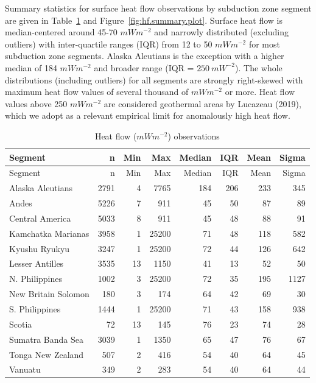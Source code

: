 \documentclass[draft,linenumbers]{agujournal2018}
\begin{document}
Summary statistics for surface heat flow observations by subduction zone
segment are given in Table~\ref{tbl:hf.summary.table} and
Figure~\ref{fig:hf.summary.plot}. Surface heat flow is median-centered
around 45-70 \(mWm^{-2}\) and narrowly distributed (excluding outliers)
with inter-quartile ranges (IQR) from 12 to 50 \(mWm^{-2}\) for most
subduction zone segments. Alaska Aleutians is the exception with a
higher median of 184 \(mWm^{-2}\) and broader range (IQR =
\(250~mW^{-2}\)). The whole distributions (including outliers) for all
segments are strongly right-skewed with maximum heat flow values of
several thousand of \(mWm^{-2}\) or more. Heat flow values above 250
\(mWm^{-2}\) are considered geothermal areas by Lucazeau (2019), which
we adopt as a relevant empirical limit for anomalously high heat flow.

\hypertarget{tbl:hf.summary.table}{}
\begin{longtable}[]{@{}lrrrrrrr@{}}
\caption{\label{tbl:hf.summary.table}Heat flow (\(mWm^{-2}\))
observations}\tabularnewline
\toprule
Segment & n & Min & Max & Median & IQR & Mean & Sigma \\
\midrule
\endfirsthead
\toprule
Segment & n & Min & Max & Median & IQR & Mean & Sigma \\
\midrule
\endhead
Alaska Aleutians & 2791 & 4 & 7765 & 184 & 206 & 233 & 345 \\
Andes & 5226 & 7 & 911 & 45 & 50 & 87 & 89 \\
Central America & 5033 & 8 & 911 & 45 & 48 & 88 & 91 \\
Kamchatka Marianas & 3958 & 1 & 25200 & 71 & 48 & 118 & 582 \\
Kyushu Ryukyu & 3247 & 1 & 25200 & 72 & 44 & 126 & 642 \\
Lesser Antilles & 3535 & 13 & 1150 & 41 & 13 & 52 & 50 \\
N. Philippines & 1002 & 3 & 25200 & 72 & 35 & 195 & 1127 \\
New Britain Solomon & 180 & 3 & 174 & 64 & 42 & 69 & 30 \\
S. Philippines & 1444 & 1 & 25200 & 71 & 43 & 158 & 938 \\
Scotia & 72 & 13 & 145 & 76 & 23 & 74 & 28 \\
Sumatra Banda Sea & 3039 & 1 & 1350 & 65 & 47 & 76 & 67 \\
Tonga New Zealand & 507 & 2 & 416 & 54 & 40 & 64 & 45 \\
Vanuatu & 349 & 2 & 283 & 54 & 40 & 64 & 44 \\
\bottomrule
\end{longtable}
\end{document}
